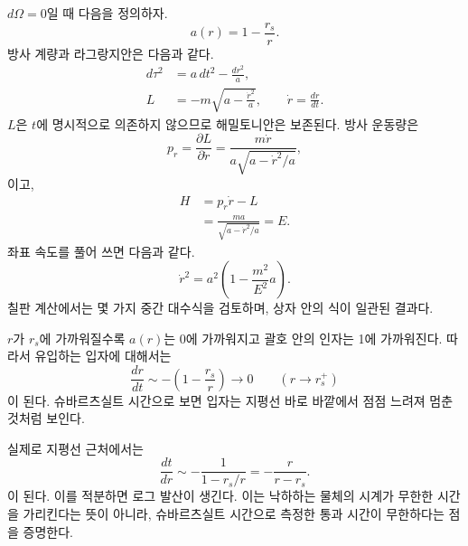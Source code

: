 \(d\Omega=0\)일 때 다음을 정의하자.
\begin{equation}
a(r)=1-\frac{r_s}{r}.
\label{eq:l5-a-def}
\end{equation}
방사 계량과 라그랑지안은 다음과 같다.
\begin{align}
d\tau^2&=a\,dt^2-\frac{dr^2}{a},\\
L&=-m\sqrt{a-\frac{\dot r^2}{a}},
\qquad
\dot r=\frac{dr}{dt}.
\label{eq:l5-radial-lagrangian}
\end{align}
\(L\)은 \(t\)에 명시적으로 의존하지 않으므로 해밀토니안은 보존된다. 방사 운동량은
\begin{equation}
p_r=\frac{\partial L}{\partial\dot r}
=\frac{m\dot r}{a\sqrt{a-\dot r^2/a}},
\label{eq:l5-radial-momentum}
\end{equation}
이고,
\begin{align}
H
&=p_r\dot r-L\\
&=\frac{ma}{\sqrt{a-\dot r^2/a}}
=E.
\label{eq:l5-radial-energy}
\end{align}
좌표 속도를 풀어 쓰면 다음과 같다.
\begin{equation}
\boxed{
\dot r^2
=a^2\left(1-\frac{m^2}{E^2}a\right).
}
\label{eq:l5-radial-velocity}
\end{equation}
칠판 계산에서는 몇 가지 중간 대수식을 검토하며, 상자 안의 식이 일관된 결과다.

\(r\)가 \(r_s\)에 가까워질수록 \(a(r)\)는 0에 가까워지고 괄호 안의 인자는 1에 가까워진다. 따라서 유입하는 입자에 대해서는
\begin{equation}
\frac{dr}{dt}
\sim -\left(1-\frac{r_s}{r}\right)
\longrightarrow 0
\qquad(r\longrightarrow r_s^+)
\label{eq:l5-infall-freeze}
\end{equation}
이 된다. 슈바르츠실트 시간으로 보면 입자는 지평선 바로 바깥에서 점점 느려져 멈춘 것처럼 보인다.

\begin{classroomqa}
\end{classroomqa}

실제로 지평선 근처에서는
\begin{equation}
\frac{dt}{dr}
\sim-\frac{1}{1-r_s/r}
=-\frac{r}{r-r_s}.
\end{equation}
이 된다. 이를 적분하면 로그 발산이 생긴다. 이는 낙하하는 물체의 시계가 무한한 시간을 가리킨다는 뜻이 아니라, 슈바르츠실트 시간으로 측정한 통과 시간이 무한하다는 점을 증명한다.

